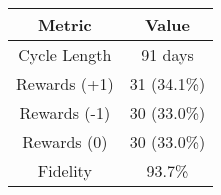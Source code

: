 \begin{tabular}{cc}
\toprule
Metric & Value \\
\midrule
Cycle Length & 91 days \\
Rewards (+1) & 31 (34.1\%) \\
Rewards (-1) & 30 (33.0\%) \\
Rewards (0) & 30 (33.0\%) \\
Fidelity & 93.7\% \\
\bottomrule
\end{tabular}
